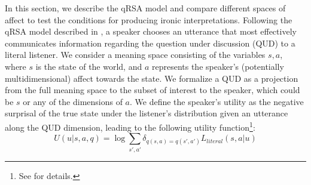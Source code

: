 \documentclass[10pt,letterpaper]{article}
\begin{document}
In this section, we describe the qRSA model and compare different spaces of affect to test the conditions for producing ironic interpretations. 
%
%
%
Following the qRSA model described in , a speaker chooses an utterance that most effectively communicates information regarding the question under discussion (QUD) to a literal listener. We consider a meaning space consisting of the variables $s, a$, where $s$ is the state of the world, and $a$ represents the speaker's (potentially multidimensional) affect towards the state. 
We formalize a QUD as a projection from the full meaning space to the subset of interest to the speaker, which could be $s$ or any of the dimensions of $a$. 
We define the speaker's utility as the negative surprisal of the true state under the listener's distribution given an utterance along the QUD dimension, leading to the following utility function\footnote{See  for details.}:
%
\begin{equation}
U(u | s, a, q) = \log \sum_{s', a'} \delta_{q(s, a)=q(s', a')} L_{literal}(s, a |u)
\end{equation}
\end{document}
